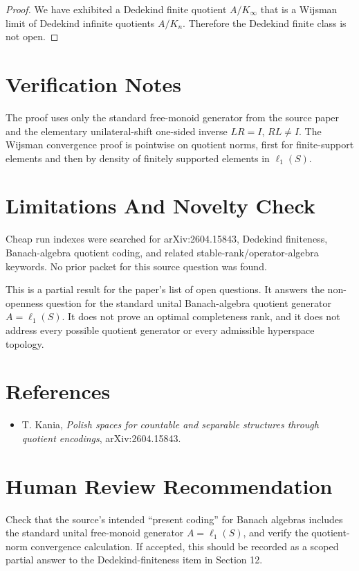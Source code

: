 \documentclass[11pt]{article}
\begin{document}
\begin{proof}
We have exhibited a Dedekind finite quotient \(A/K_\infty\) that is a Wijsman
limit of Dedekind infinite quotients \(A/K_n\).  Therefore the Dedekind finite
class is not open.
\end{proof}

\section*{Verification Notes}

The proof uses only the standard free-monoid generator from the source paper
and the elementary unilateral-shift one-sided inverse \(LR=I\), \(RL\ne I\).
The Wijsman convergence proof is pointwise on quotient norms, first for
finite-support elements and then by density of finitely supported elements in
\(\ell_1(S)\).

\section*{Limitations And Novelty Check}

Cheap run indexes were searched for arXiv:2604.15843, Dedekind finiteness,
Banach-algebra quotient coding, and related stable-rank/operator-algebra
keywords.  No prior packet for this source question was found.

This is a partial result for the paper's list of open questions.  It answers
the non-openness question for the standard unital Banach-algebra quotient
generator \(A=\ell_1(S)\).  It does not prove an optimal completeness rank, and
it does not address every possible quotient generator or every admissible
hyperspace topology.

\section*{References}

\begin{itemize}
\item T. Kania, \emph{Polish spaces for countable and separable structures
through quotient encodings}, arXiv:2604.15843.
\end{itemize}

\section*{Human Review Recommendation}

Check that the source's intended ``present coding'' for Banach algebras includes
the standard unital free-monoid generator \(A=\ell_1(S)\), and verify the
quotient-norm convergence calculation.  If accepted, this should be recorded as
a scoped partial answer to the Dedekind-finiteness item in Section 12.
\end{document}
